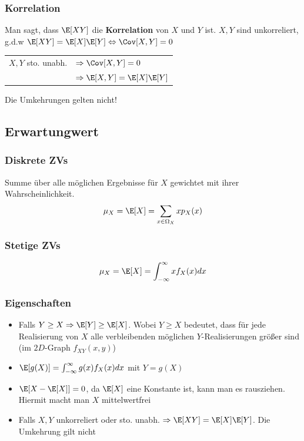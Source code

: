\begin{sectionbox}
    \subsubsection{Korrelation}
    Man sagt, dass $\E[XY]$ die \textbf{Korrelation} von $X$ und $Y$ ist. 
    $X,Y$ sind unkorreliert, g.d.w $\E[XY]=\E[X]\E[Y] \Leftrightarrow \Cov[X,Y]=0$ \\
    \begin{tabular*}{\linewidth}{ll}
        $X,Y$ sto. unabh. & $\Rightarrow \Cov[X,Y]=0$ \\
                          & $\Rightarrow \E[X,Y]=\E[X]\E[Y]$
    \end{tabular*}
    Die Umkehrungen gelten nicht!
\end{sectionbox}

\subsection{Erwartungwert}
\begin{sectionbox}
    \subsubsection{Diskrete ZVs}
    \begin{emphbox}
        Summe über alle möglichen Ergebnisse für $X$ gewichtet mit ihrer Wahrscheinlichkeit.
        \begin{equation*}
            \mu_X = \E[X] = \sum_{x\in\Omega_X}xp_X(x)
        \end{equation*}
    \end{emphbox}

    \subsubsection{Stetige ZVs}
    \begin{emphbox}
        \begin{equation*}
            \mu_X = \E[X] = \int_{-\infty}^\infty x f_X(x)dx
        \end{equation*}
    \end{emphbox}

    \subsubsection{Eigenschaften}
    \begin{itemize}
        \item Falls $Y \ge X \Rightarrow \E[Y] \ge \E[X]$. Wobei $Y\ge X$ bedeutet, dass für jede Realisierung von $X$ alle verbleibenden möglichen $Y$-Realisierungen größer sind (im $2D$-Graph $f_{XY}(x,y)$)
        \item $\E[g(X)]=\int_{-\infty}^\infty g(x)f_X(x)dx$ mit $Y=g(X)$
        \item $\E[X-\E[X]] = 0$, da $\E[X]$ eine Konstante ist, kann man es rausziehen. Hiermit macht man $X$ mittelwertfrei
        \item Falls $X,Y$ unkorreliert oder sto. unabh. $\Rightarrow \E[XY]=\E[X]\E[Y]$. Die Umkehrung gilt nicht
    \end{itemize}
\end{sectionbox}

